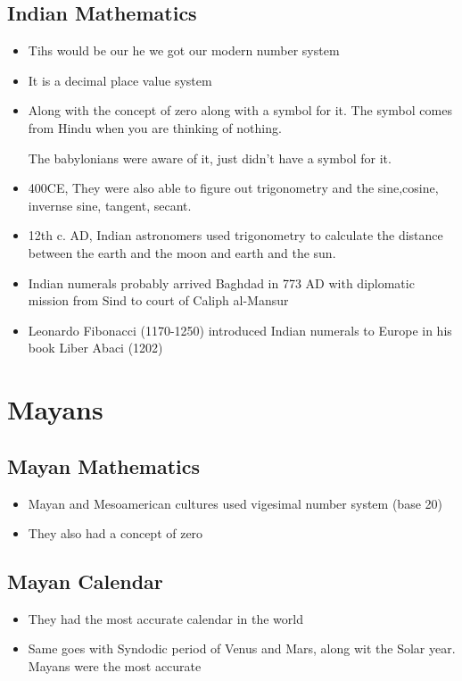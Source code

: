 \documentclass{article}
\begin{document}
\subsection{Indian Mathematics}
\begin{itemize}
  \item Tihs would be our he we got our modern number system
  \item It is a decimal place value system
  \item Along with the concept of zero along with a symbol for it.
    The symbol comes from Hindu when you are thinking of nothing.

    The babylonians were aware of it, just didn't have a symbol for it.
  \item 400CE, They were also able to figure out trigonometry
    and the sine,cosine, invernse sine, tangent, secant.
  \item 12th c. AD, Indian astronomers used trigonometry to calculate the
    distance between the earth and the moon and earth and the sun.
  \item Indian numerals probably arrived Baghdad in 773 AD with
    diplomatic mission from Sind to court of Caliph al-Mansur
  \item Leonardo Fibonacci (1170-1250) introduced Indian numerals to Europe
    in his book Liber Abaci (1202)
\end{itemize}

\section{Mayans}
\subsection{Mayan Mathematics}
\begin{itemize}
  \item Mayan and Mesoamerican cultures used vigesimal number system (base 20)
  \item They also had a concept of zero
\end{itemize}

\subsection{Mayan Calendar}
\begin{itemize}
  \item They had the most accurate calendar in the world
  \item Same goes with Syndodic period of Venus and Mars, along
    wit the Solar year. Mayans were the most accurate

\end{itemize}
\end{document}

